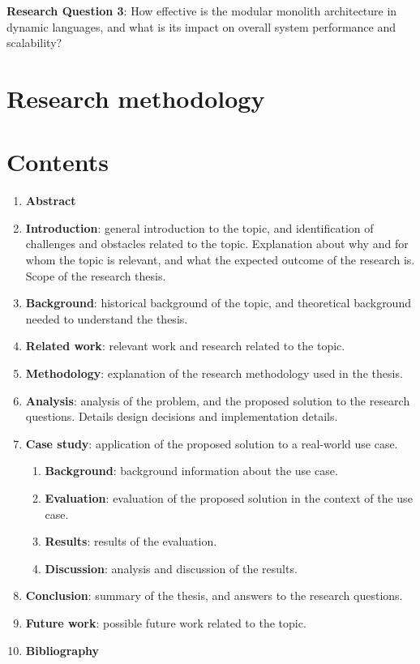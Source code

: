 \documentclass[12pt]{article}
\begin{document}
	\textbf{Research Question 3}: How effective is the modular monolith architecture in dynamic languages, and what is its impact on overall system performance and scalability?

	\clearpage

	\section{Research methodology}\label{sec:research-methodology}

	\clearpage

	\section{Contents}\label{sec:contents}

	\begin{enumerate}
		\item \textbf{Abstract}
		\item \textbf{Introduction}: general introduction to the topic, and identification of challenges and obstacles related to the topic.
		Explanation about why and for whom the topic is relevant, and what the expected outcome of the research is.
		Scope of the research thesis.
		\item \textbf{Background}: historical background of the topic, and theoretical background needed to understand the thesis.
		\item \textbf{Related work}: relevant work and research related to the topic.
		\item \textbf{Methodology}: explanation of the research methodology used in the thesis.
		\item \textbf{Analysis}: analysis of the problem, and the proposed solution to the research questions.
		Details design decisions and implementation details.
		\item \textbf{Case study}: application of the proposed solution to a real-world use case.
			\begin{enumerate}
				\item \textbf{Background}: background information about the use case.
				\item \textbf{Evaluation}: evaluation of the proposed solution in the context of the use case.
				\item \textbf{Results}: results of the evaluation.
				\item \textbf{Discussion}: analysis and discussion of the results.
			\end{enumerate}
		\item \textbf{Conclusion}: summary of the thesis, and answers to the research questions.
		\item \textbf{Future work}: possible future work related to the topic.
		\item \textbf{Bibliography}
	\end{enumerate}

	\clearpage


	\nocite{*}

	\printbibliography[heading=bibintoc]
\end{document}
